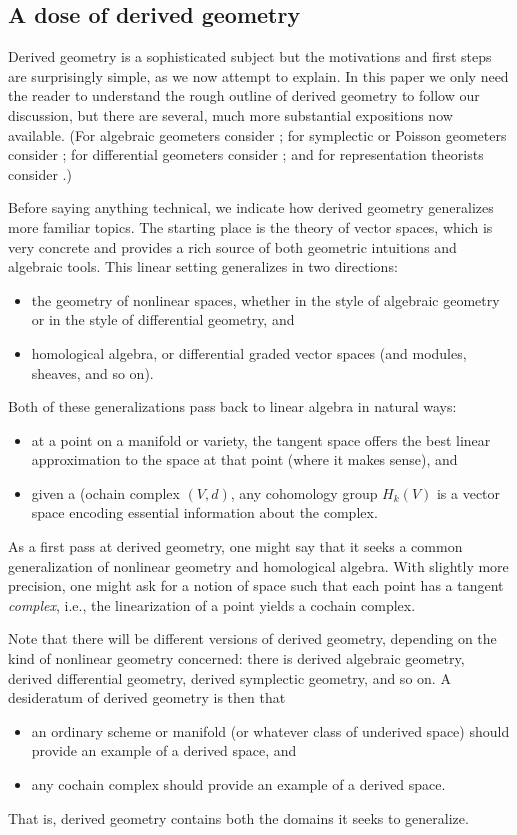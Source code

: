 \documentclass[11pt]{amsart}
\begin{document}
\subsection{A dose of derived geometry}
\label{sec: DAG}

Derived geometry is a sophisticated subject but the motivations and first steps are surprisingly simple,
as we now attempt to explain.
In this paper we only need the reader to understand the rough outline of derived geometry to follow our discussion,
but there are several, much more substantial expositions now available.
(For algebraic geometers consider \cite{TV, Lurie}; for symplectic or Poisson geometers consider \cite{PTVV, Safronov}; for differential geometers consider \cite{Joyce, Carchedi, Steffens}; and for representation theorists consider \cite{BZNad, GaiRoz, Raskin}.)

Before saying anything technical, we indicate how derived geometry generalizes more familiar topics.
The starting place is the theory of vector spaces, which is very concrete and provides a rich source of both geometric intuitions and algebraic tools.
This linear setting generalizes in two directions:
\begin{itemize}
\item the geometry of nonlinear spaces, whether in the style of algebraic geometry or in the style of differential geometry, and
\item homological algebra, or differential graded vector spaces (and modules, sheaves, and so on).
\end{itemize} 
Both of these generalizations pass back to linear algebra in natural ways:
\begin{itemize}
\item at a point on a manifold or variety, the tangent space offers the best linear approximation to the space at that point (where it makes sense), and
\item given a (ochain complex $(V,d)$, any cohomology group $H_k(V)$ is a vector space encoding essential information about the complex.
\end{itemize} 
As a first pass at derived geometry, one might say that it seeks a common generalization of nonlinear geometry and homological algebra.
With slightly more precision, one might ask for a notion of space such that each point has a tangent {\em complex}, i.e., the linearization of a point yields a cochain complex.

Note that there will be different versions of derived geometry, depending on the kind of nonlinear geometry concerned: 
there is derived algebraic geometry, derived differential geometry, derived symplectic geometry, and so on.
A desideratum of derived geometry is then that 
\begin{itemize}
\item an ordinary scheme or manifold (or whatever class of underived space) should provide an example of a derived space, and
\item any cochain complex should provide an example of a derived space.
\end{itemize}
That is, derived geometry contains both the domains it seeks to generalize.
\end{document}
